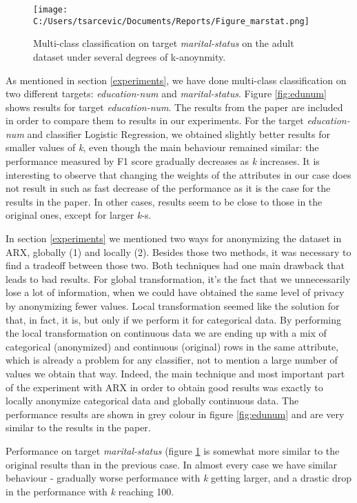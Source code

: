 \documentclass{article}
\begin{document}
\begin{figure}
	\texttt{[image: C:/Users/tsarcevic/Documents/Reports/Figure\_marstat.png]}
	\caption{Multi-class classification on target \textit{marital-status} on the adult dataset under several degrees of k-anoynmity.}
 	\label{fig:marstat}
\end{figure}

As mentioned in section \ref{experiments}, we have done multi-class classification on two different targets: \textit{education-num} and \textit{marital-status}. Figure \ref{fig:edunum} shows results for target \textit{education-num}. The results from the paper \cite{malle2017not} are included in order to compare them to results in our experiments. For the target \textit{education-num} and classifier Logistic Regression, we obtained slightly better results for smaller values of \textit{k}, even though the main behaviour remained similar: the performance measured by F1 score gradually decreases as \textit{k} increases. It is interesting to observe that changing the weights of the attributes in our case does not result in such as fast decrease of the performance as it is the case for the results in the paper. In other cases, results seem to be close to those in the original ones, except for larger \textit{k}-s.

In section \ref{experiments} we mentioned two ways for anonymizing the dataset in ARX, globally (1) and locally (2). Besides those two methods, it was necessary to find a tradeoff between those two. Both techniques had one main drawback that leads to bad results. For global transformation, it's the fact that we unnecessarily lose a lot of information, when we could have obtained the same level of privacy by anonymizing fewer values. Local transformation seemed like the solution for that, in fact, it is, but only if we perform it for categorical data. By performing the local transformation on continuous data we are ending up with a mix of categorical (anonymized) and continuous (original) rows in the same attribute, which is already a problem for any classifier, not to mention a large number of values we obtain that way. Indeed, the main technique and most important part of the experiment with ARX in order to obtain good results was exactly to locally anonymize categorical data and globally continuous data. The performance results are shown in grey colour in figure \ref{fig:edunum} and are very similar to the results in the paper. 

Performance on target \textit{marital-status} (figure \ref{fig:marstat} is somewhat more similar to the original results than in the previous case. In almost every case we have similar behaviour - gradually worse performance with \textit{k} getting larger, and a drastic drop in the performance with \textit{k} reaching 100. 
\end{document}

